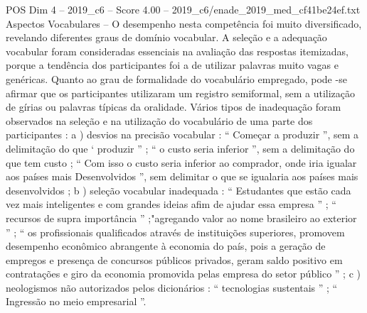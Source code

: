 \begin{textsample}{POS Dim 4 – 2019\_c6 – Score 4.00 – 2019\_c6/enade\_2019\_med\_cf41be24ef.txt}
Aspectos Vocabulares – O desempenho nesta competência foi muito diversificado, revelando diferentes graus de domínio vocabular.
A seleção e a adequação vocabular foram consideradas essenciais na avaliação das respostas itemizadas, porque a tendência dos participantes foi a de utilizar palavras muito vagas e genéricas.
Quanto ao grau de formalidade do vocabulário empregado, pode -se afirmar que os participantes utilizaram um registro semiformal, sem a utilização de gírias ou palavras típicas da oralidade.
Vários tipos de inadequação foram observados na seleção e na utilização do vocabulário de uma parte dos participantes : a ) desvios na precisão vocabular : “ Começar a produzir ”, sem a delimitação do que ‘ produzir ” ; “ o custo seria inferior ”, sem a delimitação do que tem custo ; “ Com isso o custo seria inferior ao comprador, onde iria igualar aos países mais Desenvolvidos ”, sem delimitar o que se igualaria aos países mais desenvolvidos ; b ) seleção vocabular inadequada : “ Estudantes que estão cada vez mais inteligentes e com grandes ideias afim de ajudar essa empresa ” ; “ recursos de supra importância ” ;"agregando valor ao nome brasileiro ao exterior ” ; “ os profissionais qualificados através de instituições superiores, promovem desempenho econômico abrangente à economia do país, pois a geração de empregos e presença de concursos públicos privados, geram saldo positivo em contratações e giro da economia promovida pelas empresa do setor público ” ; c ) neologismos não autorizados pelos dicionários : “ tecnologias sustentais ” ; “ Ingressão no meio empresarial ”.

\end{textsample}
